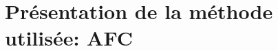 \documentclass[a4paper,notitlepage]{article}
\begin{document}


\newpage
\thispagestyle{empty}

\tableofcontents

\listoffigures

\newpage
\setcounter{page}{1}

\section{Présentation de la méthode utilisée: AFC}





\end{document}
